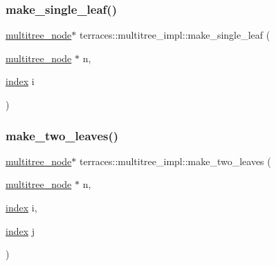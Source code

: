 \mbox{\label{namespaceterraces_1_1multitree__impl_a617319722b1ea24e7a14646ccd6d3927}} 
\subsubsection{\texorpdfstring{make\+\_\+single\+\_\+leaf()}{make\_single\_leaf()}}
{\footnotesize\ttfamily \hyperlink{structterraces_1_1multitree__node}{multitree\+\_\+node}$\ast$ terraces\+::multitree\+\_\+impl\+::make\+\_\+single\+\_\+leaf (\begin{DoxyParamCaption}\item[{\hyperlink{structterraces_1_1multitree__node}{multitree\+\_\+node} $\ast$}]{n,  }\item[{\hyperlink{namespaceterraces_adbc33ccb543d1634e96d0eb02e472c77}{index}}]{i }\end{DoxyParamCaption})\hspace{0.3cm}{\ttfamily [inline]}}

\mbox{\label{namespaceterraces_1_1multitree__impl_ad947b5544d1b10e338831969f59cd917}} 
\subsubsection{\texorpdfstring{make\+\_\+two\+\_\+leaves()}{make\_two\_leaves()}}
{\footnotesize\ttfamily \hyperlink{structterraces_1_1multitree__node}{multitree\+\_\+node}$\ast$ terraces\+::multitree\+\_\+impl\+::make\+\_\+two\+\_\+leaves (\begin{DoxyParamCaption}\item[{\hyperlink{structterraces_1_1multitree__node}{multitree\+\_\+node} $\ast$}]{n,  }\item[{\hyperlink{namespaceterraces_adbc33ccb543d1634e96d0eb02e472c77}{index}}]{i,  }\item[{\hyperlink{namespaceterraces_adbc33ccb543d1634e96d0eb02e472c77}{index}}]{j }\end{DoxyParamCaption})\hspace{0.3cm}{\ttfamily [inline]}}

